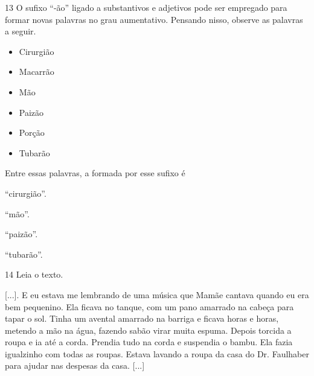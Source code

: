 \num{13} O sufixo ``-ão'' ligado a substantivos e adjetivos pode ser
empregado para formar novas palavras no grau aumentativo. Pensando
nisso, observe as palavras a seguir.

\begin{myquote}
\begin{itemize}
\item Cirurgião

\item Macarrão

\item Mão

\item Paizão

\item Porção

\item Tubarão
\end{itemize}
\end{myquote}

Entre essas palavras, a formada por esse sufixo é

\begin{escolha}
\item ``cirurgião''.

\item ``mão''.

\item ``paizão''.

\item ``tubarão''.
\end{escolha}


\num{14} Leia o texto.

\begin{myquote}
{[}...{]}. E eu estava me lembrando de uma música que Mamãe cantava
quando eu era bem pequenino. Ela ficava no tanque, com um pano amarrado
na cabeça para tapar o sol. Tinha um avental amarrado na barriga e
ficava horas e horas, metendo a mão na água, fazendo sabão virar muita
espuma. Depois torcida a roupa e ia até a corda. Prendia tudo na corda e
suspendia o bambu. Ela fazia igualzinho com todas as roupas. Estava
lavando a roupa da casa do Dr. Faulhaber para ajudar nas despesas da
casa. {[}...{]}

\end{myquote}

